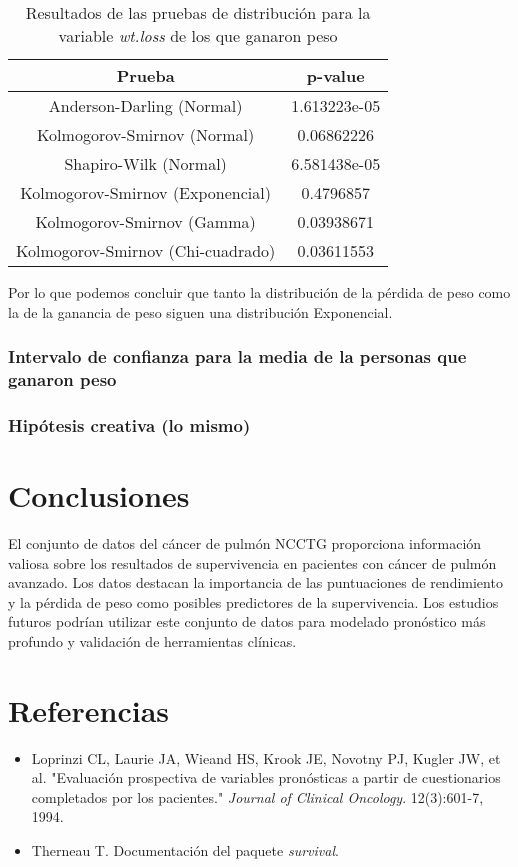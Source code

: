\documentclass[a4paper,12pt]{article}
\begin{document}
\begin{table}[h!]
    \centering
    \begin{tabular}{|c|c|}
        \hline
        \textbf{Prueba} & \textbf{p-value} \\
        \hline
        Anderson-Darling (Normal) & 1.613223e-05 \\
        \hline
        Kolmogorov-Smirnov (Normal) & 0.06862226 \\
        \hline
        Shapiro-Wilk (Normal) & 6.581438e-05 \\
        \hline
        Kolmogorov-Smirnov (Exponencial) & 0.4796857 \\
        \hline
        Kolmogorov-Smirnov (Gamma) & 0.03938671 \\
        \hline
        Kolmogorov-Smirnov (Chi-cuadrado) & 0.03611553 \\
        \hline
    \end{tabular}
    \caption{Resultados de las pruebas de distribución para la variable \textit{wt.loss} de los que ganaron peso}
    \label{tab:pruebas_distribucion_wt_loss_GANANCIA}
\end{table}

Por lo que podemos concluir que tanto la distribución de la pérdida de peso como la de la ganancia de peso siguen una distribución Exponencial.

\subsubsection*{Intervalo de confianza para la media de la personas que ganaron peso}

\subsubsection*{Hipótesis creativa (lo mismo)}




	\section*{Conclusiones}
	El conjunto de datos del cáncer de pulmón NCCTG proporciona información valiosa sobre los resultados de supervivencia en pacientes con cáncer de pulmón avanzado. Los datos destacan la importancia de las puntuaciones de rendimiento y la pérdida de peso como posibles predictores de la supervivencia. Los estudios futuros podrían utilizar este conjunto de datos para modelado pronóstico más profundo y validación de herramientas clínicas.
	
	\section*{Referencias}
	\begin{itemize}
		\item Loprinzi CL, Laurie JA, Wieand HS, Krook JE, Novotny PJ, Kugler JW, et al. "Evaluación prospectiva de variables pronósticas a partir de cuestionarios completados por los pacientes." \textit{Journal of Clinical Oncology}. 12(3):601-7, 1994.
		\item Therneau T. Documentación del paquete \textit{survival}.
	\end{itemize}
	
\end{document}
